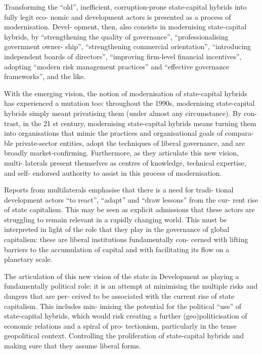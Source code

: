 \documentclass[
]{book}
\begin{document}
Transforming
the ``old'', inefficient, corruption-prone state-capital hybrids into fully legit eco-
nomic and development actors is presented as a process of modernisation. Devel-
opment, then, also consists in modernising state-capital hybrids, by
``strengthening the quality of governance'', ``professionalising government owner-
ship'', ``strengthening commercial orientation'', ``introducing independent boards
of directors'', ``improving firm-level financial incentives'', adopting ``modern risk
management practices'' and ``effective governance frameworks'', and the like.

With the emerging vision, the notion of modernisation of state-capital hybrids has
experienced a mutation too: throughout the 1990s, modernising state-capital
hybrids simply meant privatising them (under almost any circumstance). By con-
trast, in the 21 st century, modernising state-capital hybrids means turning them
into organisations that mimic the practices and organisational goals of compara-
ble private-sector entities, adopt the techniques of liberal governance, and are
broadly market-confirming. Furthermore, as they articulate this new vision, multi-
laterals present themselves as centres of knowledge, technical expertise, and self-
endorsed authority to assist in this process of modernisation.

Reports from multilaterals emphasise that there is a need for tradi-
tional development actors ``to react'', ``adapt'' and ``draw lessons'' from the cur-
rent rise of state capitalism. This may be seen as explicit admissions that these
actors are struggling to remain relevant in a rapidly changing world.
This must be interpreted in light of the role that they play in the
governance of global capitalism: these are liberal institutions fundamentally con-
cerned with lifting barriers to the accumulation of capital and with facilitating its
flow on a planetary scale.

The articulation
of this new vision of the state in Development as playing a fundamentally political
role: it is an attempt at minimising the multiple risks and dangers that are per-
ceived to be associated with the current rise of state capitalism. This includes min-
imising the potential for the political ``use'' of state-capital hybrids, which would
risk creating a further (geo)politicisation of economic relations and a spiral of pro-
tectionism, particularly in the tense geopolitical context.
Controlling the proliferation of state-capital hybrids and making sure that they
assume liberal forms.
\end{document}
